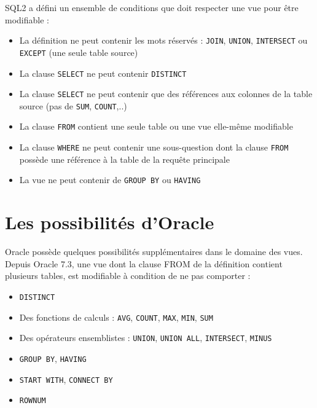 \documentclass[10pt]{beamer}
\begin{document}
\begin{frame}{\secname}
    SQL2 a défini un ensemble de conditions que doit respecter une vue pour être modifiable :
    \begin{itemize}
        \item La définition ne peut contenir les mots réservés : \lstinline[language=plsql]!JOIN!, \lstinline[language=plsql]!UNION!, \lstinline[language=plsql]!INTERSECT! ou \lstinline[language=plsql]!EXCEPT! (une seule table source)
        \item La clause \lstinline[language=plsql]!SELECT! ne peut contenir \lstinline[language=plsql]!DISTINCT!
        \item La clause \lstinline[language=plsql]!SELECT! ne peut contenir que des références aux colonnes de la table source (pas de \lstinline[language=plsql]!SUM!, \lstinline[language=plsql]!COUNT!,..)
        \item La clause \lstinline[language=plsql]!FROM! contient une seule table ou une vue elle-même modifiable
        \item La clause \lstinline[language=plsql]!WHERE! ne peut contenir une sous-question dont la clause \lstinline[language=plsql]!FROM! possède une référence à la table de la requête principale
        \item La vue ne peut contenir de \lstinline[language=plsql]!GROUP BY! ou \lstinline[language=plsql]!HAVING!
    \end{itemize}
\end{frame}

\section{Les possibilités d'Oracle}
\begin{frame}{\secname}
    Oracle possède quelques possibilités supplémentaires dans le domaine des vues.
    Depuis Oracle 7.3, une vue dont la clause FROM de la définition contient plusieurs tables, est modifiable à condition de ne pas comporter :

    \begin{itemize}
        \item \lstinline[language=plsql]!DISTINCT!
        \item Des fonctions de calculs : \lstinline[language=plsql]!AVG!, \lstinline[language=plsql]!COUNT!, \lstinline[language=plsql]!MAX!, \lstinline[language=plsql]!MIN!, \lstinline[language=plsql]!SUM!
        \item Des opérateurs ensemblistes : \lstinline[language=plsql]!UNION!, \lstinline[language=plsql]!UNION ALL!, \lstinline[language=plsql]!INTERSECT!, \lstinline[language=plsql]!MINUS!
        \item \lstinline[language=plsql]!GROUP BY!, \lstinline[language=plsql]!HAVING!
        \item \lstinline[language=plsql]!START WITH!, \lstinline[language=plsql]!CONNECT BY!
        \item \lstinline[language=plsql]!ROWNUM!
    \end{itemize}
\end{frame}


\end{document}
